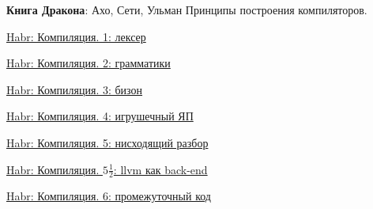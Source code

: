 \label{exdragon}\cite{dragonbook} \textbf{Книга Дракона}: Ахо, Сети, Ульман
Принципы построения компиляторов.

\bigskip

\href{http://habrahabr.ru/post/99162/}{Habr: Компиляция. 1: лексер}

\href{http://habrahabr.ru/post/99298/}{Habr: Компиляция. 2: грамматики}

\href{http://habrahabr.ru/post/99366/}{Habr: Компиляция. 3: бизон}

\href{http://habrahabr.ru/post/99397/}{Habr: Компиляция. 4: игрушечный ЯП}

\href{http://habrahabr.ru/post/99466/}{Habr: Компиляция. 5: нисходящий разбор}

\href{http://habrahabr.ru/post/102597/}{Habr: Компиляция. $5\frac{1}{2}$: llvm
как back-end}

\href{http://habrahabr.ru/post/99592/}{Habr: Компиляция. 6: промежуточный код}

